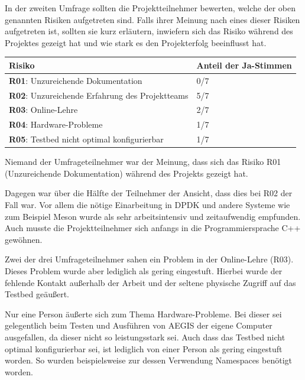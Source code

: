 \documentclass[../review_3.tex]{subfiles}
\begin{document}
In der zweiten Umfrage sollten die Projektteilnehmer bewerten, welche der oben genannten Risiken aufgetreten sind. Falls ihrer Meinung nach eines dieser Risiken aufgetreten ist, sollten sie kurz erläutern, inwiefern sich das Risiko während des Projektes gezeigt hat und wie stark es den Projekterfolg beeinflusst hat.

\begin{longtable}[h]{p{8.5cm} p{5.3cm}}
    \toprule
    \textbf{Risiko}                                        & \textbf{Anteil der Ja-Stimmen} \\ \midrule \endhead
    \textbf{R01}: Unzureichende Dokumentation              & 0/7                                          \\
    \textbf{R02}: Unzureichende Erfahrung des Projektteams & 5/7                                          \\
    \textbf{R03}: Online-Lehre                             & 2/7                                          \\
    \textbf{R04}: Hardware-Probleme                        & 1/7                                          \\
    \textbf{R05}: Testbed nicht optimal konfigurierbar     & 1/7                                          \\ \bottomrule
\end{longtable}
Niemand der Umfrageteilnehmer war der Meinung, dass sich das Risiko R01 (Unzureichende Dokumentation) während des Projekts gezeigt hat.

Dagegen war über die Hälfte der Teilnehmer der Ansicht, dass dies bei R02 der Fall war. Vor allem die nötige Einarbeitung in DPDK und andere Systeme wie zum Beispiel Meson wurde als sehr arbeitsintensiv und zeitaufwendig empfunden. Auch musste die Projektteilnehmer sich anfangs in die Programmiersprache C++ gewöhnen.

Zwei der drei Umfrageteilnehmer sahen ein Problem in der Online-Lehre (R03).  Dieses Problem wurde aber lediglich als gering eingestuft. Hierbei wurde der fehlende Kontakt außerhalb der \glqq Arbeit\grqq{} und der seltene physische Zugriff auf das Testbed geäußert.

Nur eine Person äußerte sich zum Thema Hardware-Probleme. Bei dieser sei gelegentlich beim Testen und Ausführen von AEGIS der eigene Computer ausgefallen, da dieser nicht so leistungsstark sei. Auch dass das Testbed nicht optimal konfigurierbar sei, ist lediglich von einer Person als gering eingestuft worden. So wurden beispielsweise zur dessen Verwendung Namespaces benötigt worden.
\end{document}
